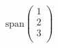 \documentclass{article}
\begin{document}
$$
\text{span}\left(
\begin{array}{c}
1 \\
2 \\
3 \\
\end{array}
\right)
$$
\end{document}

